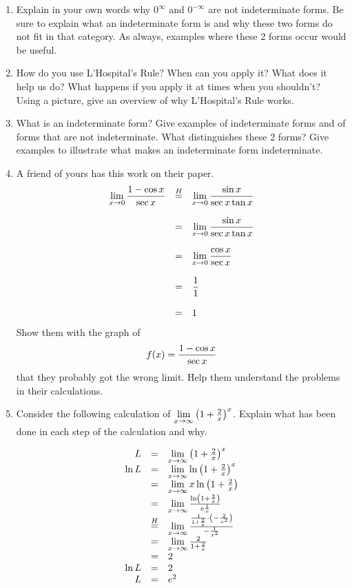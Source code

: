 \begin{enumerate}

\item  Explain in your own words why $0^\infty  $ and $0^{ - \infty } $ are not indeterminate forms.  \cite{EP}  Be sure to explain what an indeterminate form is and why these two forms do not fit in that category.  As always, examples where these 2 forms occur would be useful.

\item  How do you use L'Hospital's Rule?  When can you apply it?  What does it help us do?  What happens if you apply it at times when you shouldn't?  Using a picture, give an overview of why L'Hospital's Rule works.

\item  What is an indeterminate form?  Give examples of indeterminate forms and of forms that are not indeterminate.  What distinguishes these 2 forms?  Give examples to illustrate what makes an indeterminate form indeterminate.

\item  A friend of yours has this work on their paper.  
		$$\begin{array}{rcl} \displaystyle{\mathop {\lim }\limits_{x \to 0} {{1 - \cos x} \over {\sec x}} }&\mathop  {=} \limits^H 
&  \displaystyle{\mathop {\lim }\limits_{x \to 0} {{\sin x} \over {\sec x\tan x}} }\cr \mbox{}&&\cr   
		&=& \displaystyle{\mathop {\lim }\limits_{x \to 0} {{\sin x} \over {\sec x\tan x}}} \cr \mbox{}&&\cr   
		&=& \displaystyle{\mathop {\lim }\limits_{x \to 0} {{\cos x} \over {\sec x}} }\cr     \mbox{}&&\cr   
		&= &\displaystyle{{1 \over 1}} \cr  \mbox{}&&\cr   
		&=&1\end{array} $$
Show them with the graph of $$f(x) = {{1 - \cos x} \over {\sec x}}$$ that they probably got the wrong limit.  Help them understand the problems in their calculations.

\item Consider the following calculation of  $\displaystyle
\mathop {\lim }\limits_{x \to \infty } \left( {1 + {\textstyle{2 \over x}}} \right)^x 
$.  Explain what has been done in each step of the calculation and why.

$$
\begin{array}{rcl}
  L 
  	&= 
  		&\mathop {\lim }\limits_{x \to \infty } \left( {1 + {2 \over x}} \right)^x  \cr 
  		\ln L
  	& =
  		& \mathop {\lim }\limits_{x \to \infty } \ln \left( {1 + {2 \over x}} \right)^x  \cr 
   	&=
   		& \mathop {\lim }\limits_{x \to \infty } x\ln \left( {1 + {2 \over x}} \right) \cr 
   	&=
   		& \mathop {\lim }\limits_{x \to \infty } {{\ln \left( {1 + {2 \over x}} \right)} \over {e{1 \over x}}} \cr 
  	&\mathop  = \limits^H &\mathop {\lim }\limits_{x \to \infty } {{{1 \over {1 + {2 \over x}}} \cdot \left( { - {2 \over {x^2 }}} \right)} \over { - {1 \over {x^2 }}}} \cr 
  	& =
  		& \mathop {\lim }\limits_{x \to \infty } {2 \over {1 + {2 \over x}}} \cr 
  	& =
  		& 2 \cr 
  \ln L 
  	&= 
  		&2 \cr 
  L
  	& =
  		& e^2  \cr 
  		\end{array}
$$



\end{enumerate}
